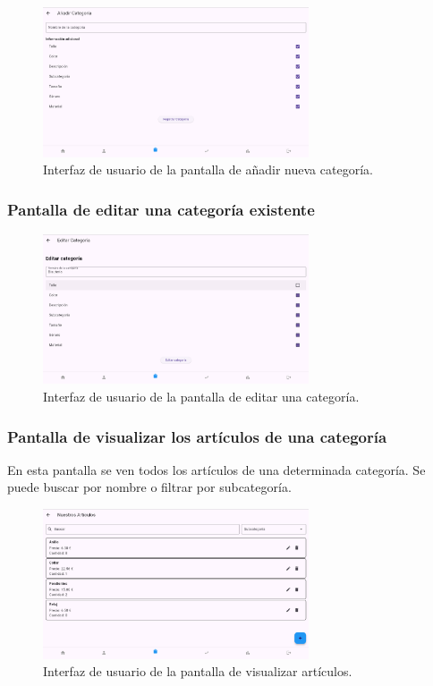\begin{figure}[H]
	\centering
	\includegraphics[width=0.7\textwidth]{imagenes/PrimeraIteracion/nuevaCategoria.png}
	\caption{Interfaz de usuario de la pantalla de añadir nueva categoría.}
	\label{fig:appNuevaCategoria}
\end{figure}

\subsubsection{Pantalla de editar una categoría existente}

\begin{figure}[H]
	\centering
	\includegraphics[width=0.7\textwidth]{imagenes/PrimeraIteracion/editarCategoria.png}
	\caption{Interfaz de usuario de la pantalla de editar una categoría.}
	\label{fig:appEditarCategoria}
\end{figure}

\subsubsection{Pantalla de visualizar los artículos de una categoría}

En esta pantalla se ven todos los artículos de una determinada categoría. Se puede buscar por nombre o filtrar por subcategoría. 

\begin{figure}[H]
	\centering
	\includegraphics[width=0.7\textwidth]{imagenes/PrimeraIteracion/visualizarArticulos.png}
	\caption{Interfaz de usuario de la pantalla de visualizar artículos.}
	\label{fig:appVisualizarArticulos}
\end{figure}

